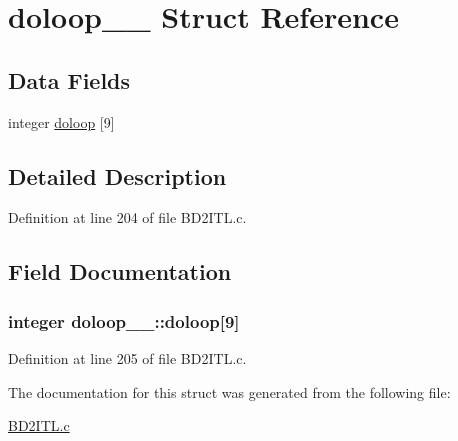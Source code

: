 \hypertarget{structdoloop__1__}{}\section{doloop\+\_\+\_\+ Struct Reference}
\label{structdoloop__1__}
\subsection*{Data Fields}
\begin{DoxyCompactItemize}
\item 
integer \hyperlink{structdoloop__1___a91cdf3c685862aab6f0931c4db01a971}{doloop} \mbox{[}9\mbox{]}
\end{DoxyCompactItemize}


\subsection{Detailed Description}


Definition at line 204 of file B\+D2\+I\+T\+L.\+c.



\subsection{Field Documentation}
\subsubsection[{\texorpdfstring{doloop}{doloop}}]{\setlength{\rightskip}{0pt plus 5cm}integer doloop\+\_\+\_\+\+::doloop\mbox{[}9\mbox{]}}\hypertarget{structdoloop__1___a91cdf3c685862aab6f0931c4db01a971}{}\label{structdoloop__1___a91cdf3c685862aab6f0931c4db01a971}


Definition at line 205 of file B\+D2\+I\+T\+L.\+c.



The documentation for this struct was generated from the following file\+:\begin{DoxyCompactItemize}
\item 
\hyperlink{BD2ITL_8c}{B\+D2\+I\+T\+L.\+c}\end{DoxyCompactItemize}
